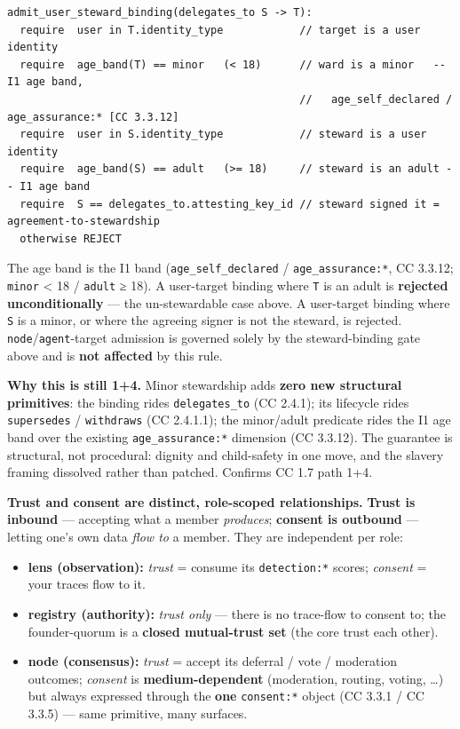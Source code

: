 \documentclass[11pt]{article}
\begin{document}
\begin{lstlisting}
admit_user_steward_binding(delegates_to S -> T):
  require  user in T.identity_type            // target is a user identity
  require  age_band(T) == minor   (< 18)      // ward is a minor   -- I1 age band,
                                              //   age_self_declared / age_assurance:* [CC 3.3.12]
  require  user in S.identity_type            // steward is a user identity
  require  age_band(S) == adult   (>= 18)     // steward is an adult -- I1 age band
  require  S == delegates_to.attesting_key_id // steward signed it = agreement-to-stewardship
  otherwise REJECT
\end{lstlisting}

The age band is the I1 band (\texttt{age\_self\_declared} / \texttt{age\_assurance:*}, CC 3.3.12; \texttt{minor} < 18 / \texttt{adult} ≥ 18). A user-target binding where \texttt{T} is an adult is \textbf{rejected unconditionally} — the un-stewardable case above. A user-target binding where \texttt{S} is a minor, or where the agreeing signer is not the steward, is rejected. \texttt{node}/\texttt{agent}-target admission is governed solely by the steward-binding gate above and is \textbf{not affected} by this rule.


\textbf{Why this is still 1+4.} Minor stewardship adds \textbf{zero new structural primitives}: the binding rides \texttt{delegates\_to} (CC 2.4.1); its lifecycle rides \texttt{supersedes} / \texttt{withdraws} (CC 2.4.1.1); the minor/adult predicate rides the I1 age band over the existing \texttt{age\_assurance:*} dimension (CC 3.3.12). The guarantee is structural, not procedural: dignity and child-safety in one move, and the slavery framing dissolved rather than patched. Confirms CC 1.7 path 1+4.


\textbf{Trust and consent are distinct, role-scoped relationships.} \textbf{Trust is inbound} — accepting what a member \textit{produces}; \textbf{consent is outbound} — letting one's own data \textit{flow to} a member. They are independent per role:

\begin{itemize}\setlength\itemsep{0pt}
\item \textbf{lens (observation):} \textit{trust} = consume its \texttt{detection:*} scores; \textit{consent} = your traces flow to it.
\item \textbf{registry (authority):} \textit{trust only} — there is no trace-flow to consent to; the founder-quorum is a \textbf{closed mutual-trust set} (the core trust each other).
\item \textbf{node (consensus):} \textit{trust} = accept its deferral / vote / moderation outcomes; \textit{consent} is \textbf{medium-dependent} (moderation, routing, voting, …) but always expressed through the \textbf{one} \texttt{consent:*} object (CC 3.3.1 / CC 3.3.5) — same primitive, many surfaces.
\end{itemize}
\end{document}
